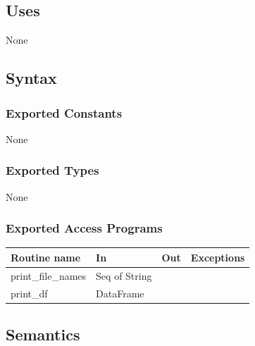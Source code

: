 \documentclass[12pt]{article}
\begin{document}
\subsection* {Uses}

None

\subsection* {Syntax}

\subsubsection* {Exported Constants}

None

\subsubsection* {Exported Types}

None

\subsubsection* {Exported Access Programs}

\begin{tabular}{| l | l | l | p{5cm} |}
  \hline
  \textbf{Routine name} & \textbf{In} & \textbf{Out} & \textbf{Exceptions}\\
  \hline
  print\_file\_names & Seq of String & & \\
  \hline
  print\_df & DataFrame & & \\
  \hline
\end{tabular}

\subsection* {Semantics}
\end{document}

